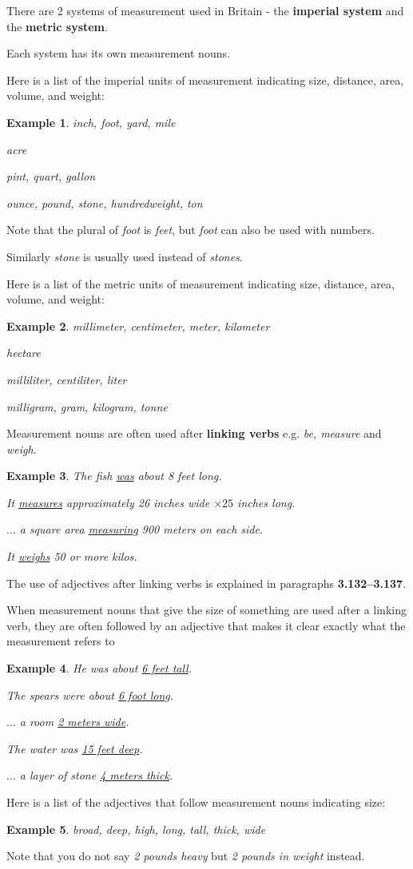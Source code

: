 \documentclass[oneside]{book}
\numberwithin{equation}{section}
\newtheorem{example}{Example}[section]
\begin{document}
%
\noindent{} There are 2 systems of measurement used in Britain - the \textbf{imperial system} and the \textbf{metric system}.

Each system has its own measurement nouns.

%
Here is a list of the imperial units of measurement indicating size, distance, area, volume, and weight:
\begin{example}
    inch, foot, yard, mile
    
    acre
    
    pint, quart, gallon
    
    ounce, pound, stone, hundredweight, ton
\end{example}
Note that the plural of \textit{foot} is \textit{feet}, but \textit{foot} can also be used with numbers.

Similarly \textit{stone} is usually used instead of \textit{stones}.

%
Here is a list of the metric units of measurement indicating size, distance, area, volume, and weight:
\begin{example}
    millimeter, centimeter, meter, kilometer
    
    hectare
    
    milliliter, centiliter, liter
    
    milligram, gram, kilogram, tonne
\end{example}
%
\noindent{} Measurement nouns are often used after \textbf{linking verbs} e.g. \textit{be, measure} and \textit{weigh}.
\begin{example}
    The fish \underline{was} about 8 feet long.
    
    It \underline{measures} approximately 26 inches wide $\times 25$ inches long.
    
    $\ldots$ a square area \underline{measuring} 900 meters on each side.
    
    It \underline{weighs} 50 or more kilos.
\end{example} 
The use of adjectives after linking verbs is explained in paragraphs \textbf{3.132--3.137}.

%
\noindent{} When measurement nouns that give the size of something are used after a linking verb, they are often followed by an adjective that makes it clear exactly what the measurement refers to
\begin{example}
    He was about \underline{6 feet tall}.
    
    The spears were about \underline{6 foot long}.
    
    $\ldots$ a room \underline{2 meters wide}.
    
    The water was \underline{15 feet deep}.
    
    $\ldots$ a layer of stone \underline{4 meters thick}.
\end{example}
Here is a list of the adjectives that follow measurement nouns indicating size:
\begin{example}
    broad, deep, high, long, tall, thick, wide
\end{example}
Note that you do not say \textit{2 pounds heavy} but \textit{2 pounds in weight} instead.
\end{document}
